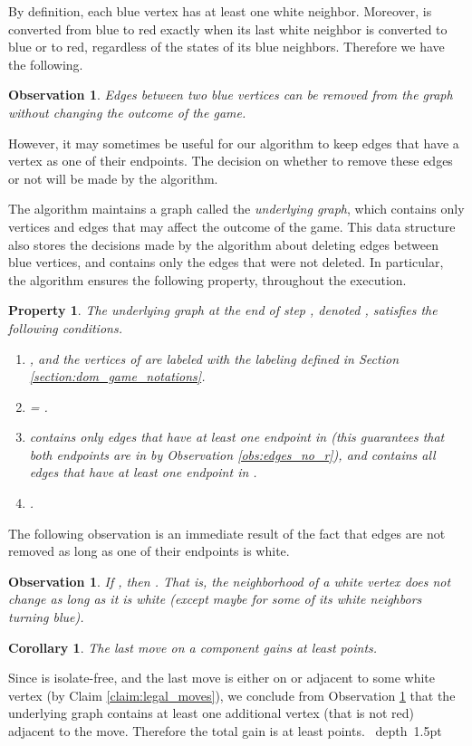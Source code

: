 \documentclass[11pt]{article}
\def\Proof{\par\noindent{\bf Proof:~}}
\def\blackslug{\hbox{\hskip 1pt \vrule width 4pt height 8pt
    depth 1.5pt \hskip 1pt}}
\def\QED{\quad\blackslug\lower 8.5pt\null\par}
\def\dnsitem{\vspace{-7pt}\item}
\newtheorem{corollary}[theorem]{Corollary}
\newtheorem{observation}[theorem]{Observation}
\newtheorem{property}[theorem]{Property}
\theoremstyle{definition}
\begin{document}
By definition, each blue vertex  has at least one white neighbor. 
Moreover,  is converted from blue to red exactly when its last white neighbor is converted to blue or to red, regardless of the states of its blue neighbors. 
Therefore we have the following.
\begin{observation}
Edges between two blue vertices can be removed from the graph without changing the outcome of the game.
\end{observation}

However, it may sometimes be useful for our algorithm to keep edges that have a  vertex as one of their endpoints.
The decision on whether to remove these edges or not will be made by the algorithm.

The algorithm maintains a graph called the \emph{underlying graph}, 
which contains only vertices and edges that may affect the outcome of the game.
This data structure also stores the decisions made by the algorithm about deleting edges between blue vertices,
and contains only the edges that were not deleted.
In particular, the algorithm ensures the following property, throughout the execution.

\begin{property}
\label{prop:underlying_graph}
The \emph{underlying graph} at the end of step , denoted , satisfies the following conditions.
\begin{enumerate}
	\dnsitem , and the vertices of  are labeled with the labeling  defined in Section \ref{section:dom_game_notations}.
	\dnsitem  = .
	\dnsitem  contains only edges that have at least one endpoint in  (this guarantees that both endpoints are in  by Observation \ref{obs:edges_no_r}),
	and contains all edges that have at least one endpoint in .
	\dnsitem .
\end{enumerate}
\end{property}

The following observation is an immediate result of the fact that edges are not removed as long as one of their endpoints is white.
\begin{observation}
\label{obs:w_neighborhood}
If , then .
That is, the neighborhood of a white vertex does not change as long as it is  white (except maybe for some of its white neighbors turning blue).
\end{observation}

\begin{corollary}
\label{cor:last_5}
The last move on a component gains at least  points.
\end{corollary}
\Proof
Since  is isolate-free, and the last move is either on or adjacent to some white vertex (by Claim \ref{claim:legal_moves}), 
we conclude from Observation \ref{obs:w_neighborhood} that the underlying graph contains at least one additional vertex (that is not red) adjacent to the move. 
Therefore the total gain is at least  points.
\QED
\end{document}
